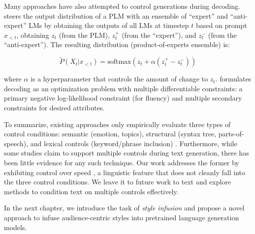 Many approaches have also attempted to control generations during decoding. \citet{liu-etal-2021-dexperts} steers the output distribution of a PLM with an ensemble of ``expert'' and ``anti-expert'' LMs by obtaining the outputs of all LMs at timestep $t$ based on prompt $x_{<t}$, obtaining $z_t$ (from the PLM), $z_t^+$ (from the ``expert''), and $z_t^-$ (from the ``anti-expert''). The resulting distribution (\ie product-of-experts ensemble) is:

\begin{equation}
    \tilde{P}(X_t | x_{<t}) = \text{softmax}(z_t + \alpha (z_t^+ - z_t^-))
\end{equation}

where $\alpha$ is a hyperparameter that controls the amount of change to $z_t$. \citet{kumar2021controlled} formulates decoding as an optimization problem with multiple differentiable constraints: a primary negative log-likelihood constraint (for fluency) and multiple secondary constraints for desired attributes.

To summarize, existing approaches only empirically evaluate three types of control conditions: semantic (\eg emotion, topics), structural (\eg syntax tree, parts-of-speech), and lexical controls (\eg keyword/phrase inclusion) \citep{Zhang2022ASO}. Furthermore, while some studies claim to support multiple controls during text generation, there has been little evidence for any such technique. Our work addresses the former by exhibiting control over speed \citep{toubia-2021}, a linguistic feature that does not cleanly fall into the three control conditions. We leave it to future work to text and explore methods to condition text on multiple controls effectively.

In the next chapter, we introduce the task of \textit{style infusion} and propose a novel approach to infuse audience-centric styles into pretrained language generation models.




